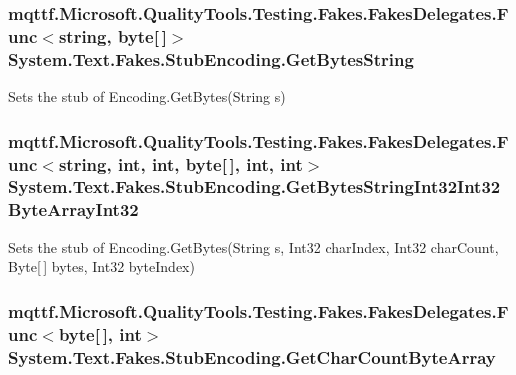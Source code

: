 \hypertarget{class_system_1_1_text_1_1_fakes_1_1_stub_encoding_ad51980b5f5c2625fb0a2f1e3c323e442}{
\subsubsection[{Get\-Bytes\-String}]{\setlength{\rightskip}{0pt plus 5cm}mqttf.\-Microsoft.\-Quality\-Tools.\-Testing.\-Fakes.\-Fakes\-Delegates.\-Func$<$string, byte\mbox{[}$\,$\mbox{]}$>$ System.\-Text.\-Fakes.\-Stub\-Encoding.\-Get\-Bytes\-String}}\label{class_system_1_1_text_1_1_fakes_1_1_stub_encoding_ad51980b5f5c2625fb0a2f1e3c323e442}


Sets the stub of Encoding.\-Get\-Bytes(\-String s)

\hypertarget{class_system_1_1_text_1_1_fakes_1_1_stub_encoding_abbe18ecafa27562e2e4a7d32a9c0bc34}{
\subsubsection[{Get\-Bytes\-String\-Int32\-Int32\-Byte\-Array\-Int32}]{\setlength{\rightskip}{0pt plus 5cm}mqttf.\-Microsoft.\-Quality\-Tools.\-Testing.\-Fakes.\-Fakes\-Delegates.\-Func$<$string, int, int, byte\mbox{[}$\,$\mbox{]}, int, int$>$ System.\-Text.\-Fakes.\-Stub\-Encoding.\-Get\-Bytes\-String\-Int32\-Int32\-Byte\-Array\-Int32}}\label{class_system_1_1_text_1_1_fakes_1_1_stub_encoding_abbe18ecafa27562e2e4a7d32a9c0bc34}


Sets the stub of Encoding.\-Get\-Bytes(\-String s, Int32 char\-Index, Int32 char\-Count, Byte\mbox{[}$\,$\mbox{]} bytes, Int32 byte\-Index)

\hypertarget{class_system_1_1_text_1_1_fakes_1_1_stub_encoding_a9e73b31ed6c6702889c288c35492f566}{
\subsubsection[{Get\-Char\-Count\-Byte\-Array}]{\setlength{\rightskip}{0pt plus 5cm}mqttf.\-Microsoft.\-Quality\-Tools.\-Testing.\-Fakes.\-Fakes\-Delegates.\-Func$<$byte\mbox{[}$\,$\mbox{]}, int$>$ System.\-Text.\-Fakes.\-Stub\-Encoding.\-Get\-Char\-Count\-Byte\-Array}}\label{class_system_1_1_text_1_1_fakes_1_1_stub_encoding_a9e73b31ed6c6702889c288c35492f566}


